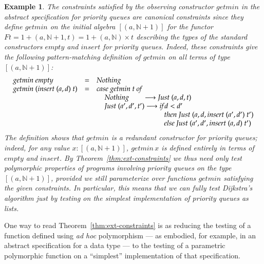 \documentclass{article}[12 pt]
\newtheorem{example}{Example}
\theoremstyle{problemstyle}
\begin{document}
\begin{example}\label{ex:getmin}
The constraints satisfied by the observing constructor
$\mathit{getmin}$ in the abstract specification for priority queues
are canonical constraints since they define $\mathit{getmin}$ on the
initial algebra $[(a, \mathbb{N} + 1)]$ for the functor $F t = 1 + (a,
\mathbb{N} + 1, t) = 1 + (a, \mathbb{N}) \times t$ describing the
types of the standard constructors $\mathit{empty}$ and
$\mathit{insert}$ for priority queues. Indeed, these constraints give
the following pattern-matching definition of $\mathit{getmin}$ on all
terms of type $[(a, \mathbb{N} + 1)]$:
\[\begin{array}{lll}
\mathit{getmin~empty}            & = & \mathit{Nothing}\\
\mathit{getmin~(insert~(a,d)~t)} & = & \mathit{case~getmin~t~of}\\
 & & \;\;\;\; \mathit{Nothing} \;\;\;\;\;\;\; \longrightarrow
                 \mathit{Just}~(a, d, t)\\ 
 & & \;\;\;\; \mathit{Just}~ (a',d',t') \longrightarrow \mathit{if} d < d'\\ 
 & & \hspace*{1.3in} \mathit{then~Just~(a, d, insert~(a',d')~t')}\\
 & & \hspace*{1.3in} \mathit{else~Just~(a', d', insert~(a,d)~t')}
\end{array}\]
The definition shows that $\mathit{getmin}$ is a redundant constructor
for priority queues; indeed, for any value $x : [(a,\mathbb{N} + 1)]$,
$\mathit{getmin}\,x$ is defined entirely in terms of $\mathit{empty}$
and $\mathit{insert}$. By Theorem~\ref{thm:ext-constraints} we thus
need only test polymorphic properties of programs involving priority
queues on the type $[(a,\mathbb{N} + 1)]$, provided we still
parameterize over functions $getmin$ satisfying the given
constraints. In particular, this means that we can fully test
Dijkstra's algorithm just by testing on the simplest implementation of
priority queues as lists.
\end{example}
\noindent
One way to read Theorem~\ref{thm:ext-constraints} is as reducing the
testing of a function defined using {\em ad hoc} polymorphism --- as
embodied, for example, in an abstract specification for a data type
--- to the testing of a parametric polymorphic function on a
``simplest'' implementation of that specification.
\end{document}
